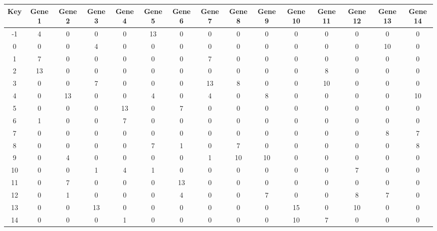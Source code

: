 \begin{tabular}{|c|c|c|c|c|c|c|c|c|c|c|c|c|c|c|}
\hline
Key & Gene 1 & Gene 2 & Gene 3 & Gene 4 & Gene 5 & Gene 6 & Gene 7 & Gene 8 & Gene 9 & Gene 10 & Gene 11 & Gene 12 & Gene 13 & Gene 14 \\
\hline
-1 & 4 & 0 & 0 & 0 & 13 & 0 & 0 & 0 & 0 & 0 & 0 & 0 & 0 & 0 \\
0 & 0 & 0 & 4 & 0 & 0 & 0 & 0 & 0 & 0 & 0 & 0 & 0 & 10 & 0 \\
1 & 7 & 0 & 0 & 0 & 0 & 0 & 7 & 0 & 0 & 0 & 0 & 0 & 0 & 0 \\
2 & 13 & 0 & 0 & 0 & 0 & 0 & 0 & 0 & 0 & 0 & 8 & 0 & 0 & 0 \\
3 & 0 & 0 & 7 & 0 & 0 & 0 & 13 & 8 & 0 & 0 & 10 & 0 & 0 & 0 \\
4 & 0 & 13 & 0 & 0 & 4 & 0 & 4 & 0 & 8 & 0 & 0 & 0 & 0 & 10 \\
5 & 0 & 0 & 0 & 13 & 0 & 7 & 0 & 0 & 0 & 0 & 0 & 0 & 0 & 0 \\
6 & 1 & 0 & 0 & 7 & 0 & 0 & 0 & 0 & 0 & 0 & 0 & 0 & 0 & 0 \\
7 & 0 & 0 & 0 & 0 & 0 & 0 & 0 & 0 & 0 & 0 & 0 & 0 & 8 & 7 \\
8 & 0 & 0 & 0 & 0 & 7 & 1 & 0 & 7 & 0 & 0 & 0 & 0 & 0 & 8 \\
9 & 0 & 4 & 0 & 0 & 0 & 0 & 1 & 10 & 10 & 0 & 0 & 0 & 0 & 0 \\
10 & 0 & 0 & 1 & 4 & 1 & 0 & 0 & 0 & 0 & 0 & 0 & 7 & 0 & 0 \\
11 & 0 & 7 & 0 & 0 & 0 & 13 & 0 & 0 & 0 & 0 & 0 & 0 & 0 & 0 \\
12 & 0 & 1 & 0 & 0 & 0 & 4 & 0 & 0 & 7 & 0 & 0 & 8 & 7 & 0 \\
13 & 0 & 0 & 13 & 0 & 0 & 0 & 0 & 0 & 0 & 15 & 0 & 10 & 0 & 0 \\
14 & 0 & 0 & 0 & 1 & 0 & 0 & 0 & 0 & 0 & 10 & 7 & 0 & 0 & 0 \\
\hline
\end{tabular}